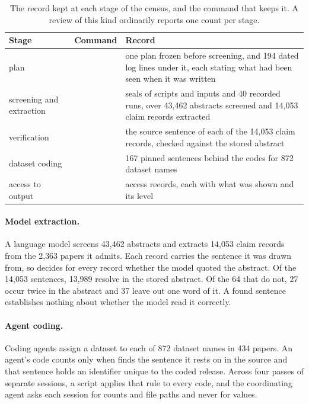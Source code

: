 \begin{table}[H]
\centering
\small
\caption{The record kept at each stage of the census, and the command that keeps it. A review of
this kind ordinarily reports one count per stage.}
\label{tab:census}
\begin{tabular}{@{}>{\raggedright\arraybackslash}p{}>{\raggedright\arraybackslash}p{}>{\raggedright\arraybackslash}p{}@{}}
\toprule
\textbf{Stage} & \textbf{Command} & \textbf{Record} \\
\midrule
plan & \tPlan{} & one plan frozen before screening, and 194 dated log lines under it, each stating what had been seen when it was written \\
screening and extraction & \tRun{} & 90 seals of scripts and inputs and 40 recorded runs, over 43{,}462 abstracts screened and 14{,}053 claim records extracted \\
verification & \tCite{} & the source sentence of each of the 14{,}053 claim records, checked against the stored abstract \\
dataset coding & \tCite{} & 2{,}167 pinned sentences behind the codes for 872 dataset names \\
access to output & \tRun{} & 26 access records, each with what was shown and its level \\
\bottomrule
\end{tabular}
\end{table}

\paragraph{Model extraction.} A language model screens 43{,}462 abstracts and extracts 14{,}053
claim records from the 2{,}363 papers it admits. Each record carries the sentence it was drawn
from, so  decides for every record whether the model quoted the abstract.
Of the 14{,}053 sentences, 13{,}989 resolve in the stored abstract. Of the 64 that do not, 27
occur twice in the abstract and 37 leave out one word of it. A found sentence establishes nothing
about whether the model read it correctly.

\paragraph{Agent coding.} Coding agents assign a dataset to each of 872 dataset names in 434
papers. An agent's code counts only when  finds the sentence it rests on in the
source and that sentence holds an identifier unique to the coded release. Across four passes of
separate sessions, a script applies that rule to every code, and the coordinating agent asks each
session for counts and file paths and never for values.

